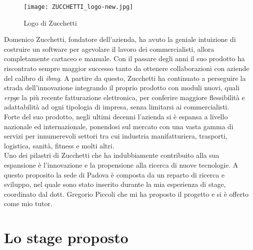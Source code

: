 \begin{figure}[htbp]
	\begin{center}
		\texttt{[image: ZUCCHETTI\_logo-new.jpg]}
		\caption{Logo di Zucchetti}
	\end{center}
\end{figure}

Domenico Zucchetti, fondatore dell'azienda, ha avuto la geniale intuizione di costruire un software per agevolare il lavoro dei commercialisti, allora completamente cartaceo e manuale. Con il passare degli anni il suo prodotto ha riscontrato sempre maggior successo tanto da ottenere collaborazioni con aziende del calibro di \emph{\gls{ibmg}}\glsfirstoccur. A partire da questo, Zucchetti ha continuato a perseguire la strada dell'innovazione integrando il proprio prodotto con moduli nuovi, quali \emph{\gls{erpg}}\glsfirstoccur e la più recente fatturazione elettronica, per conferire maggiore flessibilità e adattabilità ad ogni tipologia di impresa, senza limitarsi ai commercialisti. \\
Forte del suo prodotto, negli ultimi decenni l'azienda si è espansa a livello nazionale ed internazionale, ponendosi sul mercato con una vasta gamma di servizi per innumerevoli settori tra cui industria manifatturiera, trasporti, logistica, sanità, fitness e molti altri. \\
Uno dei pilastri di Zucchetti che ha indubbiamente contribuito alla sua espansione è l'innovazione e la propensione alla ricerca di nuove tecnologie. A questo proposito la sede di Padova è composta da un reparto di ricerca e sviluppo, nel quale sono stato inserito durante la mia esperienza di stage, coordinato dal dott. Gregorio Piccoli che mi ha proposto il progetto e si è offerto come mio tutor.
\section{Lo stage proposto}
